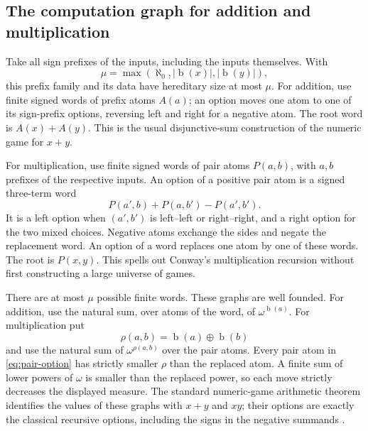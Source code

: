 \documentclass[11pt,letterpaper]{article}
\theoremstyle{definition}
\theoremstyle{remark}
\newcommand{\bd}{\operatorname{b}}
\newcommand{\nsum}{\mathbin{\oplus}}
\newcommand{\card}[1]{\lvert#1\rvert}
\begin{document}
\subsection{The computation graph for addition and multiplication}

Take all sign prefixes of the inputs, including the inputs themselves. With
\[
 \mu=\max(\aleph_0,\card{\bd(x)},\card{\bd(y)}),
\]
this prefix family and its data have hereditary size at most $\mu$.
For addition, use finite signed words of prefix atoms $A(a)$; an option moves
one atom to one of its sign-prefix options, reversing left and right for a
negative atom. The root word is $A(x)+A(y)$. This is the usual disjunctive-sum
construction of the numeric game for $x+y$.

For multiplication, use finite signed words of pair atoms $P(a,b)$, with
$a,b$ prefixes of the respective inputs. An option of a positive pair atom
is a signed three-term word
\begin{equation}
 P(a',b)+P(a,b')-P(a',b').
 \label{eq:pair-option}
\end{equation}
It is a left option when $(a',b')$ is left--left or right--right, and a right
option for the two mixed choices. Negative atoms exchange the sides and
negate the replacement word. An option of a word replaces one atom by one
of these words. The root is $P(x,y)$. This spells out Conway's multiplication
recursion without first constructing a large universe of games.

There are at most $\mu$ possible finite words. These graphs are well founded.
For addition, use the natural sum, over atoms of the word, of
$\omega^{\bd(a)}$. For multiplication put
\[
 \rho(a,b)=\bd(a)\nsum\bd(b)
\]
and use the natural sum of $\omega^{\rho(a,b)}$ over the pair atoms.
Every pair atom in \eqref{eq:pair-option} has strictly smaller $\rho$ than the
replaced atom. A finite sum of lower powers of $\omega$ is smaller than the
replaced power, so each move strictly decreases the displayed measure.
The standard numeric-game arithmetic theorem identifies the values of these
graphs with $x+y$ and $xy$; their options are exactly the classical recursive
options, including the signs in the negative summands \cite{Conway}.
\end{document}
